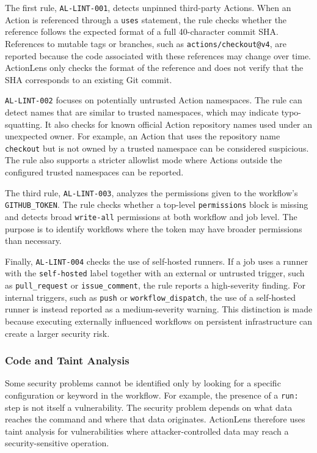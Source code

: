 \documentclass{article}
\begin{document}
The first rule, \texttt{AL-LINT-001}, detects unpinned third-party Actions. When an Action is referenced through a \texttt{uses} statement, the rule checks whether the reference follows the expected format of a full 40-character commit SHA. References to mutable tags or branches, such as \texttt{actions/checkout@v4}, are reported because the code associated with these references may change over time. ActionLens only checks the format of the reference and does not verify that the SHA corresponds to an existing Git commit.

\texttt{AL-LINT-002} focuses on potentially untrusted Action namespaces. The rule can detect names that are similar to trusted namespaces, which may indicate typo-squatting. It also checks for known official Action repository names used under an unexpected owner. For example, an Action that uses the repository name \texttt{checkout} but is not owned by a trusted namespace can be considered suspicious. The rule also supports a stricter allowlist mode where Actions outside the configured trusted namespaces can be reported.

The third rule, \texttt{AL-LINT-003}, analyzes the permissions given to the
workflow's \texttt{GITHUB\_TOKEN}. The rule checks whether a top-level
\texttt{permissions} block is missing and detects broad
\texttt{write-all} permissions at both workflow and job level. The purpose is
to identify workflows where the token may have broader permissions than
necessary.

Finally, \texttt{AL-LINT-004} checks the use of self-hosted runners. If a job uses a runner with the \texttt{self-hosted} label together with an external or untrusted trigger, such as \texttt{pull\_request} or \texttt{issue\_comment}, the rule reports a high-severity finding. For internal triggers, such as \texttt{push} or \texttt{workflow\_dispatch}, the use of a self-hosted runner is instead reported as a medium-severity warning. This distinction is made because executing externally influenced workflows on persistent infrastructure can create a larger security risk.

\subsubsection{Code and Taint Analysis}

Some security problems cannot be identified only by looking for a specific configuration or keyword in the workflow. For example, the presence of a \texttt{run:} step is not itself a vulnerability. The security problem depends on what data reaches the command and where that data originates. ActionLens therefore uses taint analysis for vulnerabilities where attacker-controlled data may reach a security-sensitive operation.
\end{document}
